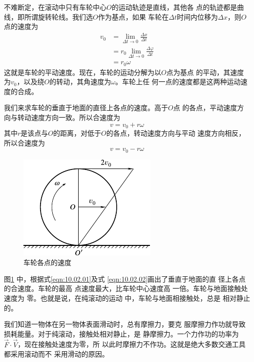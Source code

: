 \clearpage\noindent
不难断定，在滚动中只有车轮中心$ O $的运动轨迹是直线，其他各
点的轨迹都是曲线，即所谓旋转轮线。我们选$ O $作为基点，如果
车轮在$ \Delta t $时间内位移为$ \Delta x $，则$ O $点的速度为
\begin{equation*}
  \begin{split}
    v _ { 0 } &= \lim_{ \Delta t \to 0 } \frac { \Delta x } { \Delta t} \\
    &= r_ { 0 } \lim_{ \Delta t \to 0 } \frac { \Delta \varphi } { \Delta t } \\
    &= r _ { 0 } \omega
  \end{split}
\end{equation*}
这就是车轮的平动速度。现在，车轮的运动分解为以$ O $点为基点
的平动，其速度为$ v _ { 0 } $，以及绕$ O $的转动，其角速度为$ \omega $。车轮上任
何一点的速度都是这两种运动速度的合成。

我们来求车轮的垂直于地面的直径上各点的速度。高于$ O $点
的各点，平动速度方向与转动速度方向一致。所以合速度为
\begin{equation}\label{eqn:10.02.01}
  v = v _ { 0 } + r \omega
\end{equation}
其中$ r $是该点与$ O $的距离，对低于$ O $的各点，转动速度方向与平动
速度方向相反，所以合速度为
\begin{equation}\label{eqn:10.02.02}
  v = v _ { 0 } - r \omega
\end{equation}
\begin{figure}
  \vspace{-0.8em}
  \centering
  \includegraphics{figure/fig10.10}
  \caption{车轮各点的速度}
  \label{fig:10.10}
\end{figure}
图\ref{fig:10.10} 中，根据式\eqref{eqn:10.02.01}及式
\eqref{eqn:10.02.02}画出了垂直于地面的直
径上各点的合速度。车轮的最高
点速度最大，比车轮中心速度高
一倍。车轮与地面接触处速度为
零。也就是说，在纯滚动的运动
中，车轮与地面相接触处，总是
相对静止的。

我们知道一物体在另一物体表面滑动时，总有摩擦力，要克
服摩擦力作功就导致损耗能量。对于纯滚动，接触处相对静止，是
静摩擦力。一个力作功的功率为$ \vec{F} \cdot \vec{V} $，现在接触处速度为零，所
以此时摩擦力不作功。这就是绝大多数交通工具都采用滚动而不
采用滑动的原因。

